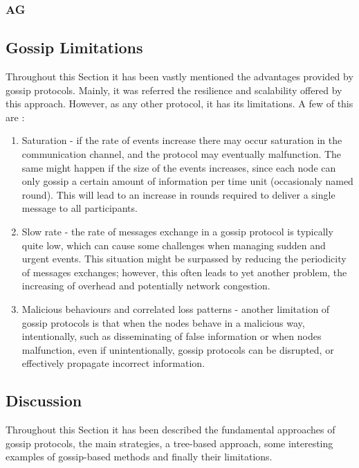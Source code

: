 \subsubsection{\Gls{AG}}
\label{subsubsec:gossip_examples_ag}
\cite{Chandra2001}

\subsection{Gossip Limitations}
\label{subsec:gossip_limitations}
Throughout this Section it has been vastly mentioned the advantages provided by gossip
protocols. Mainly, it was referred the resilience and scalability offered by this approach.
However, as any other protocol, it has its limitations. A few of this are \cite{Birman2007}:
\begin{enumerate}
      \item Saturation - if the rate of events increase there may occur saturation in the
            communication channel, and the protocol may eventually malfunction. The same might
            happen if the size of the events increases, since each node can only gossip a
            certain amount of information per time unit (occasionaly named round). This will
            lead to an increase in rounds required to deliver a single message to all
            participants.
      \item Slow rate - the rate of messages exchange in a gossip protocol is typically quite
            low, which can cause some challenges when managing sudden and urgent events. This
            situation might be surpassed by reducing the periodicity of messages exchanges;
            however, this often leads to yet another problem, the increasing of overhead and
            potentially network congestion.
      \item Malicious behaviours and correlated loss patterns - another limitation of gossip
            protocols is that when the nodes behave in a malicious way, intentionally, such as
            disseminating of false information or when nodes malfunction, even if unintentionally,
            gossip protocols can be disrupted, or effectively propagate incorrect information.
\end{enumerate}


\subsection{Discussion}
\label{subsec:gossip_discussion}
Throughout this Section it has been described the fundamental approaches of gossip protocols,
the main strategies, a tree-based approach, some interesting examples of gossip-based methods
and finally their limitations.

